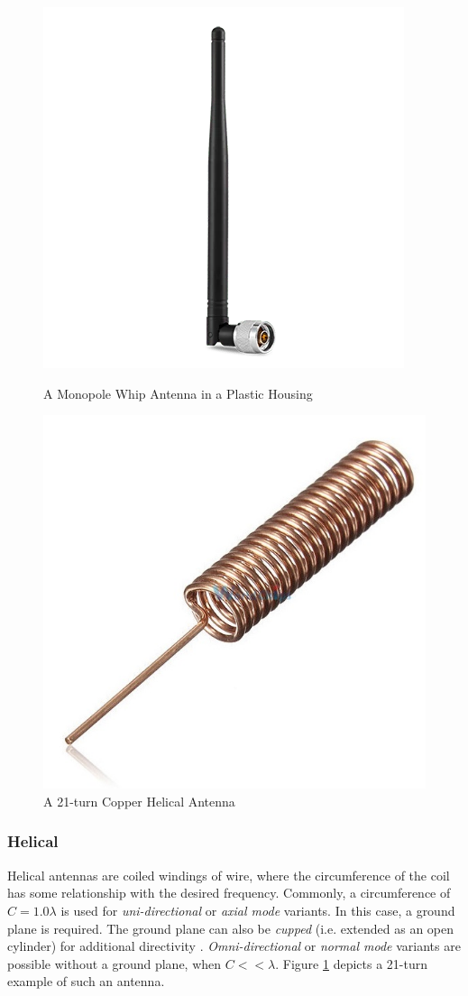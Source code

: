 \begin{figure}[!htb]
  \begin{minipage}{.49\textwidth}
    \centering
    \includegraphics[width=0.6\linewidth]{whip}
    \caption{A Monopole Whip Antenna in a Plastic Housing}
    \label{fig:whip}
  \end{minipage}
  \begin{minipage}{.49\textwidth}
    \centering
    \includegraphics[width=0.6\linewidth]{helical_uni}
    \caption{A 21-turn Copper Helical Antenna}
    \label{fig:helical_uni}
  \end{minipage}
\end{figure}

\subsubsection{Helical}
Helical antennas are coiled windings of wire, where the circumference of the coil has some relationship with the desired frequency. Commonly, a circumference of $C = 1.0 \lambda$ is used for \textit{uni-directional} or \textit{axial mode} variants. In this case, a ground plane is required. The ground plane can also be \textit{cupped} (i.e. extended as an open cylinder) for additional directivity \cite{textbook-antennaTheoryAnalysisDesign}. \textit{Omni-directional} or \textit{normal mode} variants are possible without a ground plane, when $C << \lambda$. Figure \ref{fig:helical_uni} depicts a 21-turn example of such an antenna.

